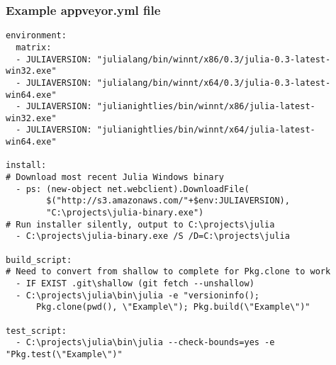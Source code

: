 \documentclass[compressed,dvips,letter]{beamer}
\begin{document}
\begin{frame}[fragile]\frametitle{Example appveyor.yml file}
{\scriptsize
\begin{verbatim}
environment:
  matrix:
  - JULIAVERSION: "julialang/bin/winnt/x86/0.3/julia-0.3-latest-win32.exe"
  - JULIAVERSION: "julialang/bin/winnt/x64/0.3/julia-0.3-latest-win64.exe"
  - JULIAVERSION: "julianightlies/bin/winnt/x86/julia-latest-win32.exe"
  - JULIAVERSION: "julianightlies/bin/winnt/x64/julia-latest-win64.exe"

install:
# Download most recent Julia Windows binary
  - ps: (new-object net.webclient).DownloadFile(
        $("http://s3.amazonaws.com/"+$env:JULIAVERSION),
        "C:\projects\julia-binary.exe")
# Run installer silently, output to C:\projects\julia
  - C:\projects\julia-binary.exe /S /D=C:\projects\julia

build_script:
# Need to convert from shallow to complete for Pkg.clone to work
  - IF EXIST .git\shallow (git fetch --unshallow)
  - C:\projects\julia\bin\julia -e "versioninfo();
      Pkg.clone(pwd(), \"Example\"); Pkg.build(\"Example\")"

test_script:
  - C:\projects\julia\bin\julia --check-bounds=yes -e "Pkg.test(\"Example\")"
\end{verbatim}
}
\end{frame}
%
%
\end{document}
